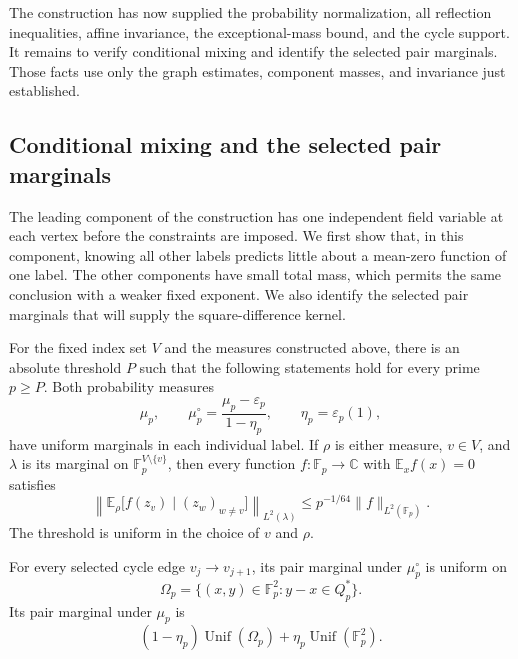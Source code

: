 The construction has now supplied the probability normalization,
all reflection inequalities, affine invariance, the exceptional-mass
bound, and the cycle support.  It remains to verify conditional mixing
and identify the selected pair marginals.  Those facts use only the
graph estimates, component masses, and invariance just established.

\subsection{Conditional mixing and the selected pair marginals}
\label{subsec:tuple-conditional-mixing}

The leading component of the construction has one independent field
variable at each vertex before the constraints are imposed.  We first
show that, in this component, knowing all other labels predicts little
about a mean-zero function of one label.  The other components have
small total mass, which permits the same conclusion with a weaker fixed
exponent.  We also identify the selected pair marginals that will supply
the square-difference kernel.

\begin{lemma}
\label{lem:conditional-mixing}
For the fixed index set \(V\) and the measures constructed above, there
is an absolute threshold \(P\) such that the following statements hold
for every prime \(p\ge P\).  Both probability measures
\[
 \mu_p,\qquad
 \mu_p^\circ=\frac{\mu_p-\varepsilon_p}{1-\eta_p},
 \qquad \eta_p=\varepsilon_p(1),
\]
have uniform marginals in each individual label.  If \(\rho\) is either
measure, \(v\in V\), and \(\lambda\) is its marginal on
\(\mathbb F_p^{V\setminus\{v\}}\), then every function
\(f:\mathbb F_p\to\mathbb C\) with \(\mathbb E_x f(x)=0\) satisfies
\begin{equation}
 \left\|\mathbb E_\rho\bigl[f(z_v)\mid(z_w)_{w\ne v}\bigr]
 \right\|_{L^2(\lambda)}
 \le p^{-1/64}\|f\|_{L^2(\mathbb F_p)}.
 \label{eq:tuple-conditional-mixing}
\end{equation}
The threshold is uniform in the choice of \(v\) and \(\rho\).

For every selected cycle edge \(v_j\to v_{j+1}\), its pair marginal
under \(\mu_p^\circ\) is uniform on
\[
 \Omega_p=\{(x,y)\in\mathbb F_p^2:y-x\in Q_p^*\}.
\]
Its pair marginal under \(\mu_p\) is
\begin{equation}
 (1-\eta_p)\operatorname{Unif}(\Omega_p)
 +\eta_p\operatorname{Unif}(\mathbb F_p^2).
 \label{eq:tuple-full-pair-law}
\end{equation}
\end{lemma}

